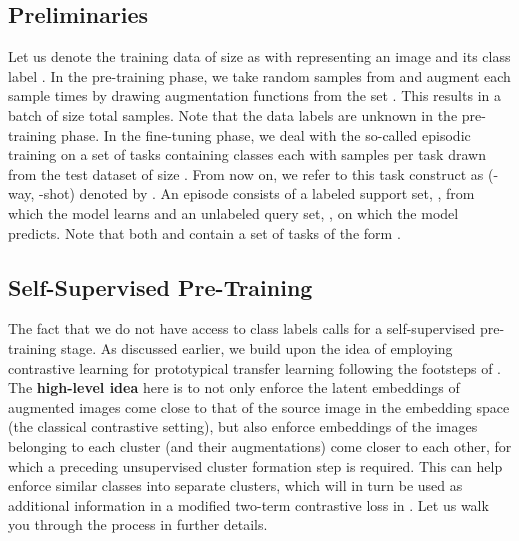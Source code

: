 \documentclass{article}
\begin{document}
\subsection{Preliminaries}\label{sse:preliminaries}

Let us denote the training data of size  as  with  representing an image  and its class label . In the pre-training phase, we take  random samples from  and augment each sample  times by drawing augmentation functions  from the set . This results in a batch of size  total samples. Note that the data labels are unknown in the pre-training phase. In the fine-tuning phase, we deal with the so-called episodic training on a set of tasks  containing  classes each with  samples per task drawn from the test dataset  of size . From now on, we refer to this task construct as (-way, -shot) denoted by . An episode consists of a labeled support set, , from which the model learns and an unlabeled query set, , on which the model predicts. Note that both  and  contain a set of tasks of the form .

\subsection{Self-Supervised Pre-Training}
\label{ssec:pretraining}
The fact that we do not have access to class labels calls for a self-supervised pre-training stage. As discussed earlier, we build upon the idea of employing contrastive learning for prototypical transfer learning following the footsteps of \citep{Medina2020Self-SupervisedClassification}. The \textbf{high-level idea} here is to not only enforce the latent embeddings of augmented images come close to that of the source image in the embedding space (the classical contrastive setting), but also enforce embeddings of the images belonging to each cluster (and their augmentations) come closer to each other, for which a preceding unsupervised cluster formation step is required. This can help enforce similar classes into separate clusters, which will in turn be used as additional information in a modified two-term contrastive loss in . Let us walk you through the process in further details. 
\end{document}
